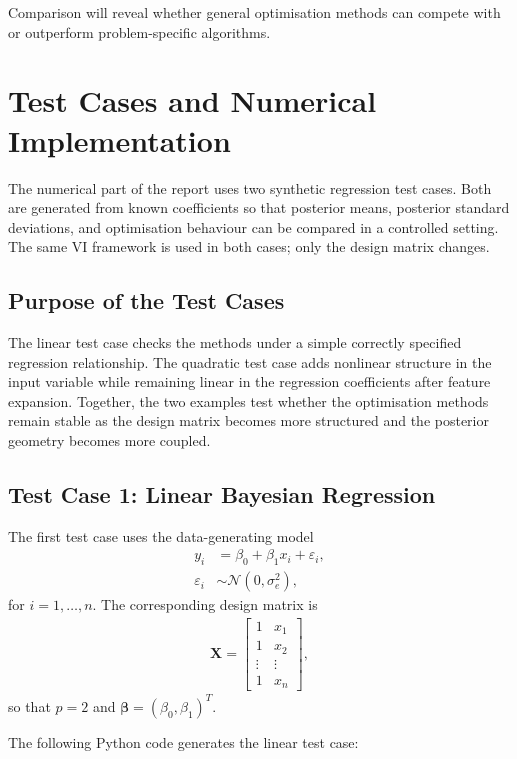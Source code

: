 \documentclass[11pt,a4paper]{article}
\newcommand{\N}{\mathcal{N}}
\begin{document}
Comparison will reveal whether general optimisation methods can compete with or outperform problem-specific algorithms.

\newpage
\section*{Test Cases and Numerical Implementation}

The numerical part of the report uses two synthetic regression test cases. Both are generated from known coefficients so that posterior means, posterior standard deviations, and optimisation behaviour can be compared in a controlled setting. The same VI framework is used in both cases; only the design matrix changes.

\subsection*{Purpose of the Test Cases}

The linear test case checks the methods under a simple correctly specified regression relationship. The quadratic test case adds nonlinear structure in the input variable while remaining linear in the regression coefficients after feature expansion. Together, the two examples test whether the optimisation methods remain stable as the design matrix becomes more structured and the posterior geometry becomes more coupled.

\subsection*{Test Case 1: Linear Bayesian Regression}

The first test case uses the data-generating model
\begin{align}
y_i &= \beta_0 + \beta_1 x_i + \varepsilon_i,\\
\varepsilon_i &\sim \N(0,\sigma_e^2),
\end{align}
for $i=1,\ldots,n$. The corresponding design matrix is
\begin{align}
\bm{X} =
\begin{bmatrix}
1 & x_1\\
1 & x_2\\
\vdots & \vdots\\
1 & x_n
\end{bmatrix},
\end{align}
so that $p=2$ and $\bm{\beta}=(\beta_0,\beta_1)^T$.

The following Python code generates the linear test case:
\end{document}
